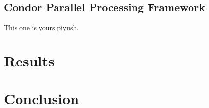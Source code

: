 \documentclass{article}
\begin{document}
\subsection{Condor Parallel Processing Framework}
This one is yours piyush.

\section{Results}

\section{Conclusion}


	

\end{document}
